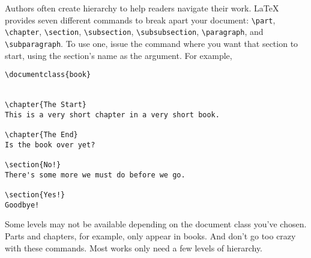 Authors often create hierarchy to help readers navigate their work.
\LaTeX{} provides seven different commands to break apart your document:
\verb|\part|, \verb|\chapter|, \verb|\section|, \verb|\subsection|,
\verb|\subsubsection|, \verb|\paragraph|, and \verb|\subparagraph|.
To use one, issue the command where you want that section to start,
using the section's name as the argument.
For example,
\begin{leftfigure}
\begin{lstlisting}
\documentclass{book}


\chapter{The Start}
This is a very short chapter in a very short book.

\chapter{The End}
Is the book over yet?

\section{No!}
There's some more we must do before we go.

\section{Yes!}
Goodbye!

\end{lstlisting}
\end{leftfigure}
Some levels may not be available depending on the document class
you've chosen. Parts and chapters, for example, only appear in books.
And don't go too crazy with these commands.
Most works only need a few levels of hierarchy.

